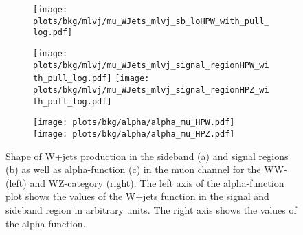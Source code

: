 \begin{figure}
	\centering
	\begin{subfigure}{\textwidth}
		\centering
		\texttt{[image: plots/bkg/mlvj/mu\_WJets\_mlvj\_sb\_loHPW\_with\_pull\_log.pdf]}		
		\caption{}		
	\end{subfigure}
	\begin{subfigure}{\textwidth}
		\texttt{[image: plots/bkg/mlvj/mu\_WJets\_mlvj\_signal\_regionHPW\_with\_pull\_log.pdf]}
		\texttt{[image: plots/bkg/mlvj/mu\_WJets\_mlvj\_signal\_regionHPZ\_with\_pull\_log.pdf]}	
		\caption{}
	\end{subfigure}
	\begin{subfigure}{\textwidth}
		\texttt{[image: plots/bkg/alpha/alpha\_mu\_HPW.pdf]}
		\texttt{[image: plots/bkg/alpha/alpha\_mu\_HPZ.pdf]}
		\caption{}
	\end{subfigure}	
	\caption[Shape of W+jets production in the sideband and signal regions as well as alpha-function in the muon channel.]{Shape of W+jets production in the sideband (a) and signal regions (b) as well as alpha-function (c) in the muon channel for the WW- (left) and WZ-category (right). The left axis of the alpha-function plot shows the values of the W+jets function in the signal and sideband region in arbitrary units. The right axis shows the values of the alpha-function.}
	\label{fig:bkg:mwvmc_alpha_mu}
\end{figure}

